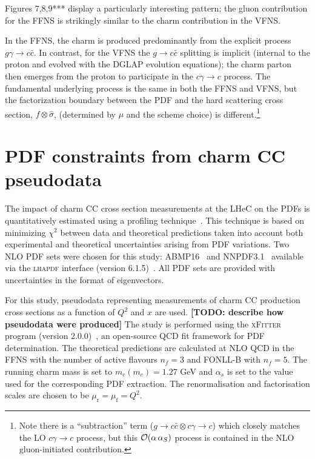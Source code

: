 \documentclass[pdftex,twocolumn,epjc3]{svjour3}          %
\newcommand{\abmp} {ABMP16\xspace}
\newcommand{\nnpdf} {NNPDF3.1\xspace}
\newcommand{\chisq}{\ensuremath{\chi^2}\xspace}
\newcommand{\xfitter} {\textsc{xFitter}\xspace}
\newcommand{\lhapdf} {{\textsc{lhapdf}}\xspace}
\begin{document}
\color{blue} %

Figures 7,8,9*** display a particularly interesting pattern; 
the gluon contribution for the FFNS  is strikingly similar to the charm contribution 
in the VFNS. 

In the FFNS, the charm is produced  predominantly from the explicit process $g \gamma\to c\bar{c}$. 
In contrast, for the VFNS the  $g\to c\bar{c}$ splitting is implicit (internal to the proton and evolved 
with the DGLAP evolution equations); the charm parton then emerges from the proton
to participate in the $c \gamma \to c$ process. 
%
The fundamental underlying process is the same in both the FFNS and VFNS, but 
the factorization boundary between the PDF and the hard scattering cross section, 
$f \otimes \hat{\sigma}$,  
(determined by $\mu$ and the scheme choice) is 
different.\footnote{Note 
there is a ``subtraction'' term  ($g\to c\bar{c} \otimes c \gamma \to c$) which closely 
matches the LO $c \gamma \to c$ process, but this ${\cal O}(\alpha \, \alpha_S)$  process is contained in the NLO gluon-initiated contribution.}



\color{black} %



\section{PDF constraints from charm CC pseudodata}
\label{sec:PDF}

The impact of charm CC cross section measurements at the LHeC on the PDFs is quantitatively estimated using a profiling technique~\cite{Paukkunen:2014zia}. This technique is based on minimizing \chisq between data and theoretical predictions taken into account both experimental and theoretical uncertainties arising from PDF variations. Two NLO PDF sets were chosen for this study: 
\abmp~\cite{Alekhin:2018pai} and \nnpdf~\cite{Ball:2017nwa} available via the \lhapdf interface (version 6.1.5)~\cite{Buckley:2014ana}. 
All PDF sets are provided with uncertainties in the format of eigenvectors. 

For this study, pseudodata representing measurements of charm CC production cross sections as a function of $Q^2$ and $x$ are used. {\bf [TODO: describe how pseudodata were produced]}
The study is performed using the \xfitter program (version 2.0.0)~\cite{Alekhin:2014irh}, an open-source QCD fit framework for PDF determination. The theoretical predictions are calculated at NLO QCD in the FFNS with the number of active flavours $n_f = 3$ and FONLL-B with $n_f = 5$. The running charm mass is set to $m_c(m_c) = 1.27$ GeV and $\alpha_s$ is set to the value used for the corresponding PDF extraction.
The renormalisation and factorisation scales are chosen to be $\mu_\mathrm{r} = \mu_\mathrm{f} = Q^2$.
\end{document}
